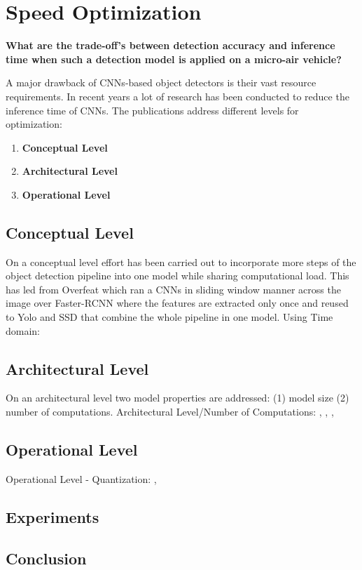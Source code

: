 \chapter{Speed Optimization}
\label{sec:tradeoff}

\begin{center}
	\textbf{What are the trade-off's between detection accuracy and inference time when such a detection model is applied on a micro-air vehicle?}
\end{center}

A major drawback of \acp{CNN}-based object detectors is their vast resource requirements. In recent years a lot of research has been conducted to reduce the inference time of \acp{CNN}. The publications address different levels for optimization:
\begin{enumerate}
	\item \textbf{Conceptual Level}
	\item \textbf{Architectural Level}
	\item \textbf{Operational Level}
\end{enumerate}

\section{Conceptual Level}
 On a conceptual level effort has been carried out to incorporate more steps of the object detection pipeline into one model while sharing computational load. This has led from Overfeat which ran a \acp{CNN} in sliding window manner across the image over Faster-RCNN where the features are extracted only once and reused to Yolo and SSD that combine the whole pipeline in one model.
 Using Time domain:
 \cite{Chen2018}
 
\section{Architectural Level}

On an architectural level two model properties are addressed: (1) model size (2) number of computations.
Architectural Level/Number of Computations:
\cite{Howard2017}, \cite{Zhang2017a}, \cite{Ghosh2017}, 

\section{Operational Level}
Operational Level - Quantization:
\cite{TripathiSanDiego}, 




\section{Experiments}


\section{Conclusion}